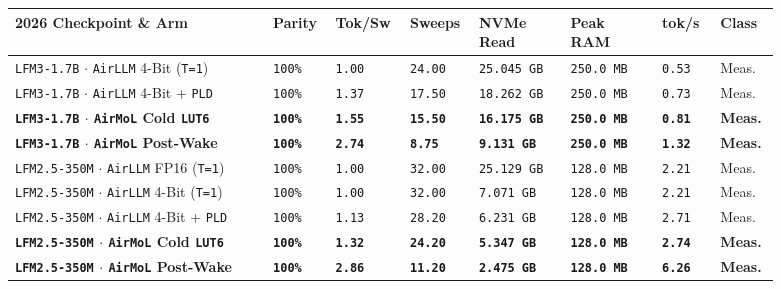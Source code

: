 \documentclass[10pt]{article}
\begin{document}
{\footnotesize\setlength{\tabcolsep}{3pt}
\begin{longtable}{@{}L{0.31\linewidth}C{0.07\linewidth}C{0.08\linewidth}C{0.07\linewidth}C{0.11\linewidth}C{0.11\linewidth}C{0.07\linewidth}L{0.07\linewidth}@{}}
\toprule
\textbf{2026 Checkpoint \& Arm} & \textbf{Parity} & \textbf{Tok/Sw} & \textbf{Sweeps} & \textbf{NVMe Read} & \textbf{Peak RAM} & \textbf{tok/s} & \textbf{Class} \\
\midrule
\endhead
\texttt{LFM3-1.7B} $\cdot$ \texttt{AirLLM} 4-Bit (\texttt{T=1}) & \texttt{100\%} & \texttt{1.00} & \texttt{24.00} & \texttt{25.045 GB} & \texttt{250.0 MB} & \texttt{0.53} & Meas. \\
\texttt{LFM3-1.7B} $\cdot$ \texttt{AirLLM} 4-Bit + \texttt{PLD} & \texttt{100\%} & \texttt{1.37} & \texttt{17.50} & \texttt{18.262 GB} & \texttt{250.0 MB} & \texttt{0.73} & Meas. \\
\textbf{\texttt{LFM3-1.7B} $\cdot$ \texttt{AirMoL} Cold \texttt{LUT6}} & \textbf{\texttt{100\%}} & \textbf{\texttt{1.55}} & \textbf{\texttt{15.50}} & \textbf{\texttt{16.175 GB}} & \textbf{\texttt{250.0 MB}} & \textbf{\texttt{0.81}} & \textbf{Meas.} \\
\textbf{\texttt{LFM3-1.7B} $\cdot$ \texttt{AirMoL} Post-Wake} & \textbf{\texttt{100\%}} & \textbf{\texttt{2.74}} & \textbf{\texttt{8.75}} & \textbf{\texttt{9.131 GB}} & \textbf{\texttt{250.0 MB}} & \textbf{\texttt{1.32}} & \textbf{Meas.} \\
\midrule
\texttt{LFM2.5-350M} $\cdot$ \texttt{AirLLM} FP16 (\texttt{T=1}) & \texttt{100\%} & \texttt{1.00} & \texttt{32.00} & \texttt{25.129 GB} & \texttt{128.0 MB} & \texttt{2.21} & Meas. \\
\texttt{LFM2.5-350M} $\cdot$ \texttt{AirLLM} 4-Bit (\texttt{T=1}) & \texttt{100\%} & \texttt{1.00} & \texttt{32.00} & \texttt{7.071 GB} & \texttt{128.0 MB} & \texttt{2.21} & Meas. \\
\texttt{LFM2.5-350M} $\cdot$ \texttt{AirLLM} 4-Bit + \texttt{PLD} & \texttt{100\%} & \texttt{1.13} & \texttt{28.20} & \texttt{6.231 GB} & \texttt{128.0 MB} & \texttt{2.71} & Meas. \\
\textbf{\texttt{LFM2.5-350M} $\cdot$ \texttt{AirMoL} Cold \texttt{LUT6}} & \textbf{\texttt{100\%}} & \textbf{\texttt{1.32}} & \textbf{\texttt{24.20}} & \textbf{\texttt{5.347 GB}} & \textbf{\texttt{128.0 MB}} & \textbf{\texttt{2.74}} & \textbf{Meas.} \\
\textbf{\texttt{LFM2.5-350M} $\cdot$ \texttt{AirMoL} Post-Wake} & \textbf{\texttt{100\%}} & \textbf{\texttt{2.86}} & \textbf{\texttt{11.20}} & \textbf{\texttt{2.475 GB}} & \textbf{\texttt{128.0 MB}} & \textbf{\texttt{6.26}} & \textbf{Meas.} \\

\end{longtable}}
\end{document}
